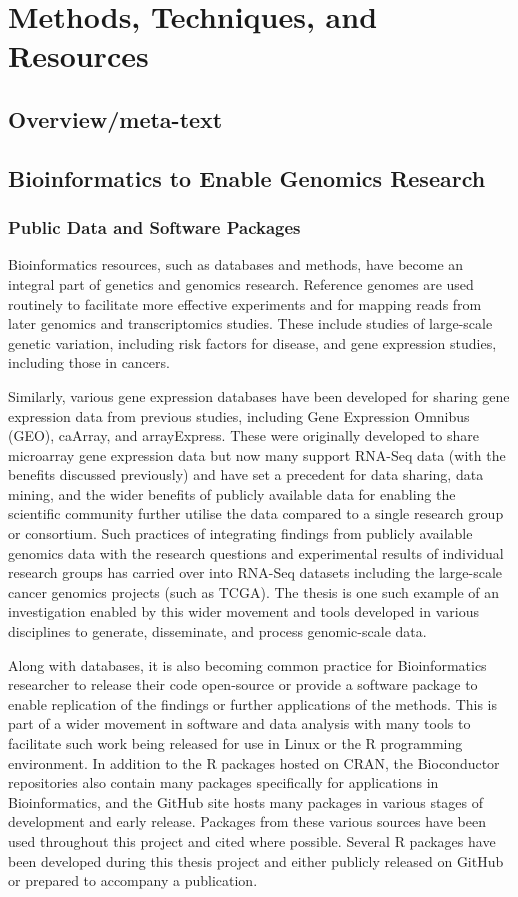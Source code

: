 \chapter{Methods, Techniques, and Resources}
\label{chap:methods}

\section{Overview/meta-text}
\section{Bioinformatics to Enable Genomics Research}
\subsection{Public Data and Software Packages}
Bioinformatics resources, such as databases and methods, have become an integral part of genetics and genomics research. Reference genomes are used routinely to facilitate more effective experiments and for mapping reads from later genomics and transcriptomics studies. These include studies of large-scale genetic variation, including risk factors for disease, and gene expression studies, including those in cancers.

Similarly, various gene expression databases have been developed for sharing gene expression data from previous studies, including Gene Expression Omnibus (GEO), caArray, and arrayExpress. These were originally developed to share microarray gene expression data but now many support RNA-Seq data (with the benefits discussed previously) and have set a precedent for data sharing, data mining, and the wider benefits of publicly available data for enabling the scientific community further utilise the data compared to a single research group or consortium. Such practices of integrating findings from publicly available genomics data with the research questions and experimental results of individual research groups has carried over into RNA-Seq datasets including the large-scale cancer genomics projects (such as TCGA). The thesis is one such example of an investigation enabled by this wider movement and tools developed in various disciplines to generate, disseminate, and process genomic-scale data.
 
Along with databases, it is also becoming common practice for Bioinformatics researcher to release their code open-source or provide a software package to enable replication of the findings or further applications of the methods. This is part of a wider movement in software and data analysis with many tools to facilitate such work being released for use in Linux or the R programming environment. In addition to the R packages hosted on CRAN, the Bioconductor repositories also contain many packages specifically for applications in Bioinformatics, and the GitHub site hosts many packages in various stages of development and early release. Packages from these various sources have been used throughout this project and cited where possible. Several R packages have been developed during this thesis project and either publicly released on GitHub or prepared to accompany a publication.


